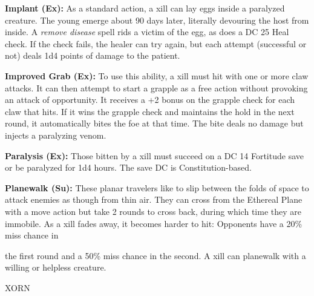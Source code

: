 \documentclass{article}
\begin{document}
\textbf{Implant (Ex): }As a standard action, a xill can lay eggs inside a paralyzed 
creature. The young emerge about 90 days later, literally devouring the host from 
inside. A \textit{remove disease }spell rids a victim of the egg, as does a DC 
25 Heal check. If the check fails, the healer can try again, but each attempt (successful 
or not) deals 1d4 points of damage to the patient.

\textbf{Improved Grab (Ex): }To use this ability, a xill must hit with one or more 
claw attacks. It can then attempt to start a grapple as a free action without provoking 
an attack of opportunity. It receives a +2 bonus on the grapple check for each 
claw that hits. If it wins the grapple check and maintains the hold in the next 
round, it automatically bites the foe at that time. The bite deals no damage but 
injects a paralyzing venom.

\textbf{Paralysis (Ex):} Those bitten by a xill must succeed on a DC 14 Fortitude 
save or be paralyzed for 1d4 hours. The save DC is Constitution-based.

\textbf{Planewalk (Su): }These planar travelers like to slip between the folds 
of space to attack enemies as though from thin air. They can cross from the Ethereal 
Plane with a move action but take 2 rounds to cross back, during which time they 
are immobile. As a xill fades away, it becomes harder to hit: Opponents have a 
20\% miss chance in

the first round and a 50\% miss chance in the second. A xill can planewalk with 
a willing or helpless creature.

\vspace{12pt}
{\LARGE{}XORN}
\end{document}
